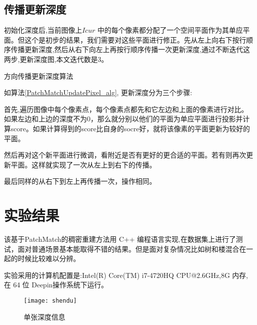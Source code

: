 \subsection{传播更新深度}
初始化深度后,当前图像上$I {cur}$ 中的每个像素都分配了一个空间平面作为其单应平面。但这个是初步的结果，我们需要对这些平面进行修正。先从左上向右下按行顺序传播更新深度,然后从右下向左上再按行顺序传播一次更新深度,通过不断迭代这两步,更新深度图,本文迭代数是3。
\begin{algorithm}[H]
	\caption{方向传播更新深度算法} 
	\label{PatchMatchUpdatePixel_alg} 
\end{algorithm}
如算法\ref{PatchMatchUpdatePixel_alg}, 更新深度分为三个步骤:\par
首先,遍历图像中每个像素点，每个像素点都先和它左边和上面的像素进行对比。如果左边和上边的深度不为0，那么就分别以他们的平面为单应平面进行投影并计算score。如果计算得到的score比自身的socre好，就将该像素的平面更新为较好的平面。\par
然后再对这个新平面进行微调，看附近是否有更好的更合适的平面。若有则再次更新平面。这样就实现了一次从左上到右下的传播。\par
最后同样的从右下到左上再传播一次，操作相同。
\section{实验结果}
该基于PatchMatch的稠密重建方法用 C++ 编程语言实现,在数据集上进行了测试，面对普通场景基本能取得不错的结果。但是面对复杂情况比如树和楼混合在一起的时候比较难以分辨。\par
实验采用的计算机配置是:Intel(R) Core(TM) i7-4720HQ CPU@2.6GHz,8G 内存,在 64 位 Deepin操作系统下运行。
\begin{figure}
	\centering
	\texttt{[image: shendu]}
	\caption{单张深度信息}
\end{figure}

